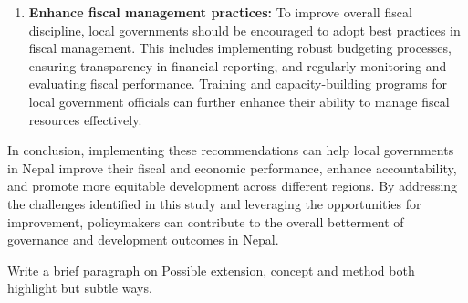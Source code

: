 \begin{enumerate}[label=\roman*.]
 \item \textbf{Enhance fiscal management practices:} To improve overall fiscal discipline, local governments should be encouraged to adopt best practices in fiscal management. This includes implementing robust budgeting processes, ensuring transparency in financial reporting, and regularly monitoring and evaluating fiscal performance. Training and capacity-building programs for local government officials can further enhance their ability to manage fiscal resources effectively.   \end{enumerate}
In conclusion, implementing these recommendations can help local governments in Nepal improve their fiscal and economic performance, enhance accountability, and promote more equitable development across different regions. By addressing the challenges identified in this study and leveraging the opportunities for improvement, policymakers can contribute to the overall betterment of governance and development outcomes in Nepal. 

Write a brief paragraph on Possible extension, concept and method both highlight but subtle ways. 
